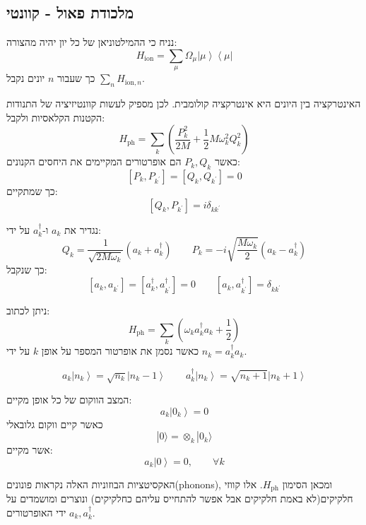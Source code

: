 \documentclass{tstextbook}
\begin{document}
\subsection{מלכודת פאול - קוונטי}

\begin{proposition}
נניח כי ההמילטוניאן של כל יון יהיה מהצורה:
$$H_{\mathrm{ion}}=\sum_{\mu}\Omega_{\mu}\left|\mu\right\rangle\left\langle\mu\right|$$
כך שעבור \(n\) יונים נקבל \(\sum_{n}H_{\text{ion},n}\).

\end{proposition}
\begin{proposition}
האינטרקציה בין היונים היא אינטרקציה קולומבית. לכן מספיק לעשות קוונטיזיציה של התנודות הקטנות הקלאסיות ולקבל:
$$H_{\mathrm{ph}}=\sum_{k}\left(\frac{P_{k}^{2}}{2M}+\frac{1}{2}M\omega_{k}^{2}Q_{k}^{2}\right)$$
כאשר \(P_{k},Q_{k}\) הם אופרטורים המקיימים את היחסים הקנונים:
$$[P_{k},P_{k^{\prime}}]=[Q_{k},Q_{k^{\prime}}]=0$$
כך שמתקיים:
$$\left[Q_{k},P_{k^{\prime}}\right]=i\delta_{k k^{\prime}}$$

\end{proposition}
\begin{definition}
נגדיר את \(a_{k}\) ו-\(a_{k}^{\dagger}\) על ידי:
$$Q_{k}=\frac{1}{\sqrt{2M\omega_{k}}}\left(a_{k}+a_{k}^{\dagger}\right)\qquad P_{k}=-i\sqrt{\frac{M\omega_{k}}{2}}\left(a_{k}-a_{k}^{\dagger}\right)$$
כך שנקבל:
$$\left[a_{k},a_{k^{\prime}}\right]=\left[a_{k}^{\dagger},a_{k^{\prime}}^{\dagger}\right]=0\qquad \left[a_{k},a_{k^{\prime}}^{\dagger}\right]=\delta_{k k^{\prime}}$$

\end{definition}
\begin{corollary}
ניתן לכתוב:
$$H_{\mathrm{ph}}=\sum_{k}\left(\omega_{k}a_{k}^{\dagger}a_{k}+\frac{1}{2}\right)$$
כאשר נסמן את אופרטור המספר על אופן \(k\) על ידי \(n_{k}=a_{k}^{\dagger}a_{k}\). 

\end{corollary}
\begin{proposition}
$$a_{k}\left|n_{k}\right\rangle=\sqrt{n_{k}}\left|n_{k}-1\right\rangle \qquad a_{k}^{\dagger}\left|n_{k}\right\rangle=\sqrt{n_{k}+1}\left|n_{k}+1\right\rangle$$

\end{proposition}
\begin{proposition}
המצב הווקום של כל אופן מקיים:
$$a_{k}\left|0_{k}\right\rangle=0$$
כאשר קיים ווקום גלובאלי $$|0\rangle=\otimes_{k}|0_{k}\rangle$$
אשר מקיים:
$$a_{k}\left|0\right\rangle=0,\qquad\forall k$$

\end{proposition}
\begin{remark}
האקסיטציות הבוזוניות האלה נקראות פונונים(phonons), ומכאן הסימון \(H_{\text{ph}}\). אלו קווזי חלקיקים(לא באמת חלקיקים אבל אפשר להתחייס עליהם כחלקיקים) ונוצרים ומושמדים על ידי האופרטורים \(a_{k},a_{k}^{\dagger}\).

\end{remark}
\end{document}
